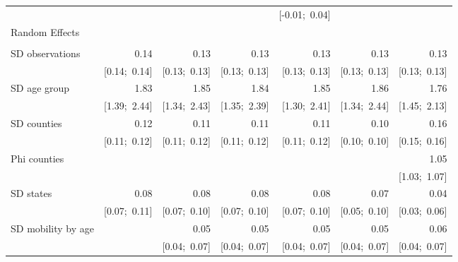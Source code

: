 \begin{sidewaystable}[htp]
\begin{center}
{\begin{tabular}{l D{.}{.}{6.11} D{.}{.}{6.11} D{.}{.}{6.11} D{.}{.}{6.11} D{.}{.}{6.11} D{.}{.}{6.11} }
                               &                 &                 &                 & [-0.01;\ 0.04]  &                 &                 \\
Random Effects                 &                 &                 &                 &                 &                 &                 \\
                               &                 &                 &                 &                 &                 &                 \\
\quad SD observations          & 0.14            & 0.13            & 0.13            & 0.13            & 0.13            & 0.13            \\
                               & [0.14;\ 0.14]   & [0.13;\ 0.13]   & [0.13;\ 0.13]   & [0.13;\ 0.13]   & [0.13;\ 0.13]   & [0.13;\ 0.13]   \\
\quad SD age group             & 1.83            & 1.85            & 1.84            & 1.85            & 1.86            & 1.76            \\
                               & [1.39;\ 2.44]   & [1.34;\ 2.43]   & [1.35;\ 2.39]   & [1.30;\ 2.41]   & [1.34;\ 2.44]   & [1.45;\ 2.13]   \\
\quad SD counties              & 0.12            & 0.11            & 0.11            & 0.11            & 0.10            & 0.16            \\
                               & [0.11;\ 0.12]   & [0.11;\ 0.12]   & [0.11;\ 0.12]   & [0.11;\ 0.12]   & [0.10;\ 0.10]   & [0.15;\ 0.16]   \\
\quad Phi counties             &                 &                 &                 &                 &                 & 1.05            \\
                               &                 &                 &                 &                 &                 & [1.03;\ 1.07]   \\
\quad SD states                & 0.08            & 0.08            & 0.08            & 0.08            & 0.07            & 0.04            \\
                               & [0.07;\ 0.11]   & [0.07;\ 0.10]   & [0.07;\ 0.10]   & [0.07;\ 0.10]   & [0.05;\ 0.10]   & [0.03;\ 0.06]   \\
\quad SD mobility by age       &                 & 0.05            & 0.05            & 0.05            & 0.05            & 0.06            \\
                               &                 & [0.04;\ 0.07]   & [0.04;\ 0.07]   & [0.04;\ 0.07]   & [0.04;\ 0.07]   & [0.04;\ 0.07]   \\

\end{tabular}}
\end{center}
\end{sidewaystable}
